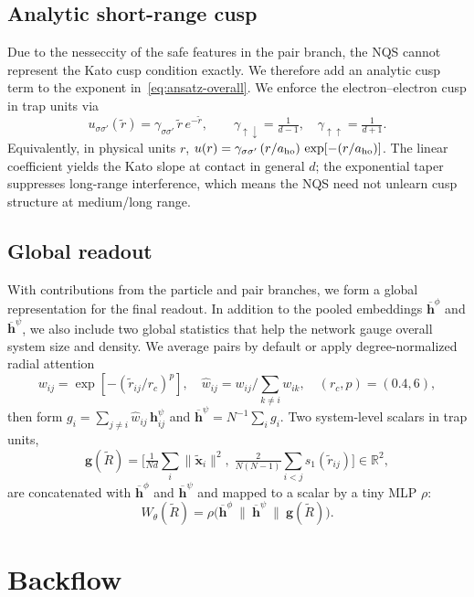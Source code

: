 \subsection{Analytic short-range cusp}
\label{subsec:cusp}
Due to the nesseccity of the safe features in the pair branch, the NQS cannot represent the Kato cusp condition exactly. 
We therefore add an analytic cusp term to the exponent in~\eqref{eq:ansatz-overall}. 
We enforce the electron–electron cusp in trap units via
\begin{equation}
  u_{\sigma\sigma'}(\tilde r)
  =
  \gamma_{\sigma\sigma'}\,\tilde r\,e^{-\tilde r},
  \qquad
  \gamma_{\uparrow\downarrow}=\tfrac{1}{d-1},\quad
  \gamma_{\uparrow\uparrow}=\tfrac{1}{d+1}.
  \label{eq:cusp}
\end{equation}
Equivalently, in physical units $r$, $u(r)=\gamma_{\sigma\sigma'}\,(r/a_{\rm ho})\,\exp[-(r/a_{\rm ho})]$.
The linear coefficient yields the Kato slope at contact in general $d$; the exponential taper suppresses long-range interference, which means the NQS need not unlearn cusp structure at medium/long range.


\subsection{Global readout}
With contributions from the particle and pair branches, we form a global representation for the final readout. In addition to the pooled embeddings $\overline{\mathbf h}^\phi$ and $\overline{\mathbf h}^\psi$, we also include two global statistics that help the network gauge overall system size and density.
We average pairs by default or apply degree-normalized radial attention
\[
  w_{ij}=\exp[-(\tilde r_{ij}/r_c)^p],\quad
  \hat w_{ij}=w_{ij}\Big/\sum_{k\ne i}w_{ik},\quad
  (r_c,p)=(0.4,6),
\]
then form $g_i=\sum_{j\ne i}\hat w_{ij}\,\mathbf h^\psi_{ij}$ and $\overline{\mathbf h}^\psi=N^{-1}\sum_i g_i$.
Two system-level scalars in trap units,
\[
  \mathbf g(\tilde{R})=
  \Big[\tfrac{1}{Nd}\sum_i\|\tilde{\mathbf x}_i\|^2,\;
       \tfrac{2}{N(N-1)}\sum_{i<j}s_1(\tilde r_{ij})\Big]\in\mathbb R^2,
\]
are concatenated with $\overline{\mathbf h}^{\phi}$ and $\overline{\mathbf h}^{\psi}$ and mapped to a scalar by a tiny MLP $\rho$:
\begin{equation}
  W_\theta(\tilde{R})
  =
  \rho\!\Big(\overline{\mathbf h}^{\phi}\ \|\ \overline{\mathbf h}^{\psi}\ \|\ \mathbf g(\tilde{R})\Big).
  \label{eq:nqs-readout}
\end{equation}

\section{Backflow}
\label{subsec:backflow-method}

